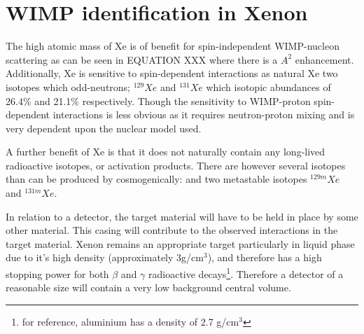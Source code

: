 \section{WIMP identification in Xenon}
\label{sec:wimps_with_xenon}

\par
The high atomic mass of Xe is of benefit for spin-independent WIMP-nucleon scattering as can be seen in EQUATION XXX where there is a $A^2$ enhancement.
Additionally, Xe is sensitive to spin-dependent interactions as natural Xe two isotopes which odd-neutrons; ${}^{129}Xe$ and ${}^{131}Xe$ which isotopic abundances of 26.4\% and 21.1\% respectively.
Though the sensitivity to WIMP-proton spin-dependent interactions is less obvious as it requires neutron-proton mixing and is very dependent upon the nuclear model used.

\par
A further benefit of Xe is that it does not naturally contain any long-lived radioactive isotopes, or activation products.
There are however several isotopes than can be produced by cosmogenically: and two metastable isotopes ${}^{129m}Xe$ and ${}^{131m}Xe$.


\par
In relation to a detector, the target material will have to be held in place by some other material.
This casing will contribute to the observed interactions in the target material.
Xenon remains an appropriate target particularly in liquid phase due to it's high density (approximately 3g/cm${}^{3}$), and therefore has a high stopping power for both $\beta$ and $\gamma$ radioactive decays\footnote{for reference, aluminium has a density of 2.7 g/cm${}^{3}$}.
Therefore a detector of a reasonable size will contain a very low background central volume.


